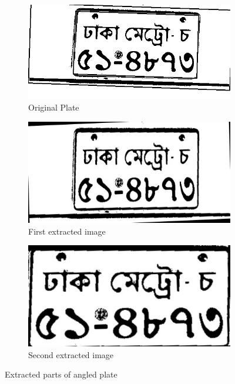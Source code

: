 \begin{figure}
\begin{subfigure}{0.33\textwidth}
    \centering
    \includegraphics[width=0.9\linewidth]{./img/experiment/stage.12/00-angle}
    \caption{Original Plate}
\end{subfigure}
\begin{subfigure}{0.33\textwidth}
    \centering
    \includegraphics[width=0.9\linewidth]{./img/experiment/stage.13/00-00-angle}
    \caption{First extracted image}
\end{subfigure}
\begin{subfigure}{0.33\textwidth}
    \centering
    \includegraphics[width=0.9\linewidth]{./img/experiment/stage.13/01-00-angle}
    \caption{Second extracted image}
\end{subfigure}
\caption{Extracted parts of angled plate}
\label{fig:ExtractedResult3}
\end{figure}


